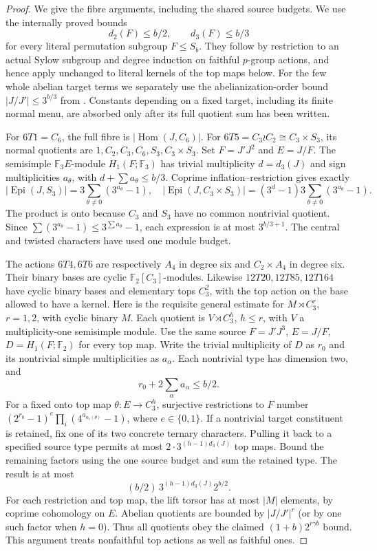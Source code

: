 \begin{proof}
We give the fibre arguments, including the shared source budgets.
We use the internally proved bounds
\[
 d_2(F)\leq b/2,\qquad d_3(F)\leq b/3
\]
for every literal permutation subgroup $F\leq S_b$.  They follow by
restriction to an actual Sylow subgroup and degree induction on faithful
$p$-group actions, and hence apply unchanged to literal kernels of the top
maps below.  For the few whole abelian target terms we separately use the
abelianization-order bound $|J/J'|\leq3^{b/3}$ from
\cite{KovacsPraeger1989}.  Constants depending on a fixed target, including
its finite normal menu, are absorbed only after its full quotient sum has
been written.

For $6T1=C_6$, the full fibre is $|\operatorname{Hom}(J,C_6)|$.
For $6T5=C_3\wr C_2\cong C_3\times S_3$, its normal quotients
are $1,C_2,C_3,C_6,S_3,C_3\times S_3$. Set $F=J'J^2$ and
$E=J/F$. The semisimple $\mathbb F_3E$-module $H_1(F;\mathbb F_3)$
has trivial multiplicity $d=d_3(J)$ and sign multiplicities
$a_\theta$, with $d+\sum a_\theta\leq b/3$. Coprime
inflation--restriction gives exactly
\[
 |\operatorname{Epi}(J,S_3)|=3\sum_{\theta\ne0}(3^{a_\theta}-1),
\quad
 |\operatorname{Epi}(J,C_3\times S_3)|
 =(3^d-1)3\sum_{\theta\ne0}(3^{a_\theta}-1).
\]
The product is onto because $C_3$ and $S_3$ have no common
nontrivial quotient. Since $\sum(3^{a_\theta}-1)\leq
3^{\sum a_\theta}-1$, each expression is at most $3^{b/3+1}$.
The central and twisted characters have used one module budget.

The actions $6T4,6T6$ are respectively $A_4$ in degree six and
$C_2\times A_4$ in degree six. Their binary bases are cyclic
$\mathbb F_2[C_3]$-modules. Likewise $12T20,12T85,12T164$ have
cyclic binary bases and elementary tops $C_3^2$, with the top
action on the base allowed to have a kernel. Here is the requisite
general estimate for $M\rtimes C_3^r$, $r=1,2$, with cyclic binary
$M$. Each quotient is $V\rtimes C_3^h$, $h\leq r$, with $V$
a multiplicity-one semisimple module. Use the same source
$F=J'J^3$, $E=J/F$, $D=H_1(F;\mathbb F_2)$ for every top map.
Write the trivial multiplicity of $D$ as $r_0$ and its nontrivial
simple multiplicities as $a_\alpha$. Each nontrivial type has
dimension two, and
\[
 r_0+2\sum_\alpha a_\alpha\leq b/2.
\]
For a fixed onto top map $\theta:E\to C_3^h$, surjective
restrictions to $F$ number
$(2^{r_0}-1)^e\prod_i(4^{a_{\alpha_i(\theta)}}-1)$, where
$e\in\{0,1\}$. If a nontrivial target constituent is retained,
fix one of its two concrete ternary characters. Pulling it back
to a specified source type permits at most
$2\cdot3^{(h-1)d_3(J)}$ top maps. Bound the remaining factors
using the one source budget and sum the retained type. The result
is at most
\[
 (b/2)\,3^{(h-1)d_3(J)}2^{b/2}.
\]
For each restriction and top map, the lift torsor has at most
$|M|$ elements, by coprime cohomology on $E$. Abelian quotients
are bounded by $|J/J'|^r$ (or by one such factor when $h=0$).
Thus all quotients obey the claimed $(1+b)2^{r\gamma b}$ bound.
This argument treats nonfaithful top actions as well as faithful ones.


\end{proof}

